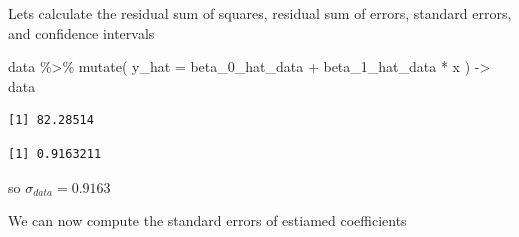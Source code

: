 \documentclass[
  letterpaper,
  DIV=11,
  numbers=noendperiod]{scrreprt}
\newenvironment{Shaded}{\begin{snugshade}}{\end{snugshade}}
\newcommand{\AttributeTok}[1]{\textcolor[rgb]{0.65,0.35,0.00}{#1}}
\newcommand{\DecValTok}[1]{\textcolor[rgb]{0.47,0.16,0.63}{#1}}
\newcommand{\FunctionTok}[1]{\textcolor[rgb]{0.02,0.16,0.49}{#1}}
\newcommand{\NormalTok}[1]{\textcolor[rgb]{0.33,0.33,0.33}{#1}}
\newcommand{\OtherTok}[1]{\textcolor[rgb]{0.85,0.12,0.09}{#1}}
\newcommand{\SpecialCharTok}[1]{\textcolor[rgb]{0.00,0.46,0.62}{#1}}
\begin{document}
Lets calculate the residual sum of squares, residual sum of errors,
standard errors, and confidence intervals

\begin{Shaded}
\begin{Highlighting}[]
\NormalTok{data }\SpecialCharTok{\%\textgreater{}\%} 
  \FunctionTok{mutate}\NormalTok{(}
    \AttributeTok{y\_hat =}\NormalTok{ beta\_0\_hat\_data }\SpecialCharTok{+}\NormalTok{ beta\_1\_hat\_data }\SpecialCharTok{*}\NormalTok{ x}
\NormalTok{  ) }\OtherTok{{-}\textgreater{}}\NormalTok{ data}
\end{Highlighting}
\end{Shaded}

\begin{Shaded}
\end{Shaded}

\begin{verbatim}
[1] 82.28514
\end{verbatim}

\begin{Shaded}
\end{Shaded}

\begin{verbatim}
[1] 0.9163211
\end{verbatim}

so \(\sigma_{data} = 0.9163\)

We can now compute the standard errors of estiamed coefficients

\begin{Shaded}
\end{Shaded}
\end{document}
